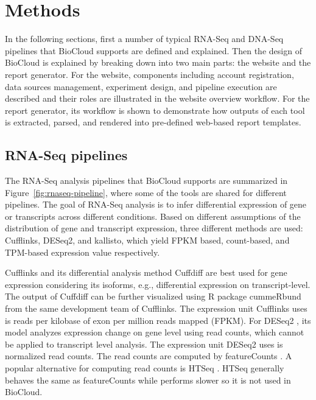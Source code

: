 \chapter{Methods}
\label{c:method}

In the following sections, first a number of typical RNA-Seq and DNA-Seq
pipelines that BioCloud supports are defined and explained. Then the design of
BioCloud is explained by breaking down into two main parts: the website and the
report generator. For the website, components including account registration,
data sources management, experiment design, and pipeline execution are
described and their roles are illustrated in the website overview workflow. For
the report generator, its workflow is shown to demonstrate how outputs of each
tool is extracted, parsed, and rendered into pre-defined web-based report
templates.



\section{RNA-Seq pipelines}
\label{s:rnaseq-pipeline}

The RNA-Seq analysis pipelines that BioCloud supports are summarized in
Figure~\ref{fig:rnaseq-pipeline}, where some of the tools are shared for
different pipelines. The goal of RNA-Seq analysis is to infer differential
expression of gene or transcripts across different conditions. Based on
different assumptions of the distribution of gene and transcript expression,
three different methods are used: Cufflinks, DESeq2, and kallisto, which yield
FPKM based, count-based, and TPM-based expression value respectively.



Cufflinks \cite{trapnell2010:transcript} and its differential analysis method
Cuffdiff \cite{trapnell2013:differential} are best used for gene expression
considering its isoforms, e.g., differential expression on transcript-level.
The output of Cuffdiff can be further visualized using R package cummeRbund
\cite{:cummerbund} from the same development team of Cufflinks. The expression
unit Cufflinks uses is reads per kilobase of exon per million reads mapped
(FPKM). For DESeq2 \cite{love2014:moderated}, its model analyzes expression
change on gene level using read counts, which cannot be applied to transcript
level analysis. The expression unit DESeq2 uses is normalized read counts. The
read counts are computed by featureCounts \cite{liao2014:featurecounts}. A
popular alternative for computing read counts is HTSeq
\cite{anders2015:htseqa}. HTSeq generally behaves the same as featureCounts while
performs slower so it is not used in BioCloud.

